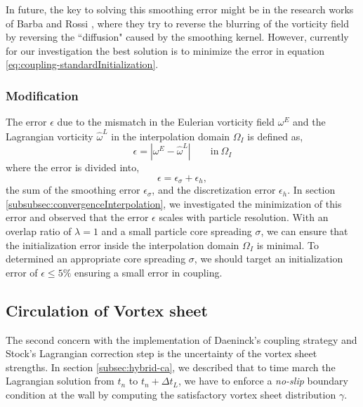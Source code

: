 	In future, the key to solving this smoothing error might be in the research works of Barba and Rossi \cite{Barba2010a}, where they try to reverse the blurring of the vorticity field by reversing the ``diffusion" caused by the smoothing kernel. However, currently for our investigation the best solution is to minimize the error in equation \ref{eq:coupling-standardInitialization}.

	\subsubsection*{Modification}

	The error $\epsilon$ due to the mismatch in the Eulerian vorticity field $\omega^E$ and the Lagrangian vorticity $\hat{\omega}^L$ in the interpolation domain $\Omega_I$ is defined as,
			\begin{equation}
			\epsilon = |\omega^E - \hat{\omega}^L| \qquad \mathrm{in}\ \Omega_I
			\label{eq:coupling-errorDefinition}
			\end{equation}
	where the error is divided into,
			\begin{equation}
			\epsilon = \epsilon_{\sigma} + \epsilon_h,
			\label{eq:coupling-totalError}
			\end{equation}
	the sum of the smoothing error $\epsilon_{\sigma}$, and the discretization error $\epsilon_h$. In section \ref{subsubsec:convergenceInterpolation}, we investigated the minimization of this error and observed that the error $\epsilon$ scales with particle resolution. With an overlap ratio of $\lambda=1$ and a small particle core spreading $\sigma$, we can ensure that the initialization error inside the interpolation domain $\Omega_I$ is minimal. To determined an appropriate core spreading $\sigma$, we should target an initialization error of $\epsilon\leqslant5\%$ ensuring a small error in coupling.
	
	\subsection{Circulation of Vortex sheet}
	\label{subsec:coupling-covs}
	
	The second concern with the implementation of Daeninck's coupling strategy and Stock's Lagrangian correction step is the uncertainty of the vortex sheet strengths. In section \ref{subsec:hybrid-ca}, we described that to time march the Lagrangian solution from $t_n$ to $t_{n}+\Delta t_L$, we have to enforce a \textit{no-slip} boundary condition at the wall by computing the satisfactory vortex sheet distribution $\gamma$. 
	
